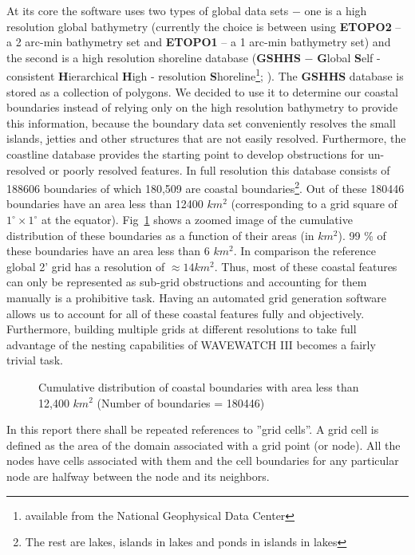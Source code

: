 \documentclass[12pt]{article}
\newcommand{\degree}{^{\circ}}
\newcounter{myfigno}[section]
\newenvironment{myfig}[1]{\begin{figure}[#1]
                        \refstepcounter{myfigno}}
                       {\end{figure}}
\newcommand{\myfcap}[1]{\begin{list}{\ff Fig. \themyfigno\ :~\hfill}
                      {\rightmargin 8mm \labelsep 0mm
                       \labelwidth 8mm \leftmargin 8mm
                       \topsep 0mm \parskip 0mm \partopsep 0mm }
                       \item \ff #1 \end{list}}
\renewcommand{\themyfigno}{\thesection.\arabic{myfigno}}
\begin{document}
At its core the software uses two types of global data sets $-$ one is a high resolution global bathymetry (currently the choice is between using {\bf ETOPO2} -- a 2 arc-min bathymetry set and {\bf ETOPO1} -- a 1 arc-min bathymetry set) and the second is a high resolution shoreline database ({\bf GSHHS} $-$ {\bf G}lobal {\bf S}elf - consistent {\bf H}ierarchical {\bf H}igh - resolution {\bf S}horeline\footnote{available from the National Geophysical Data Center}; \citealt{wesm96}). The {\bf GSHHS} database is stored as a collection of polygons. We decided to use it to determine our coastal boundaries instead of relying only on the high resolution bathymetry to provide this information, because the boundary data set conveniently resolves the small islands, jetties and other structures that are not easily resolved. Furthermore, the coastline database provides the starting point to develop obstructions for un-resolved or poorly resolved features. In full resolution this database consists of 188606 boundaries of which 180,509 are coastal boundaries\footnote{The rest are lakes, islands in lakes and ponds in islands in lakes}. Out of these 180446 boundaries have an area less than 12400 $km^2$ (corresponding to a grid square of $1\degree \times 1\degree$ at the equator). Fig~\ref{fig:gshhs_distrib} shows a zoomed image of the cumulative distribution of these boundaries as a function of their areas (in $km^2$). 99 \% of these boundaries have an area less than 6 $km^2$. In comparison the reference global 2' grid has a resolution of $\approx 14 km^2$. Thus, most of these coastal features can only be represented as sub-grid obstructions and accounting for them manually is a prohibitive task. Having an automated grid generation software allows us to account for all of these coastal features fully and objectively. Furthermore, building multiple grids at different resolutions to take full advantage of the nesting capabilities of WAVEWATCH III becomes a fairly trivial task.     

\begin{myfig}{tbp}
\centerline{}
\myfcap{Cumulative distribution of coastal boundaries with area less than 12,400 $km^2$ (Number of boundaries = 180446)}
\label{fig:gshhs_distrib}
\end{myfig}

 In this report there shall be repeated references to ''grid cells''. A grid cell is defined as the area of the domain associated with a grid point (or node). All the nodes have cells associated with them and the cell boundaries for any particular node are halfway between the node and its neighbors. 
\end{document}
